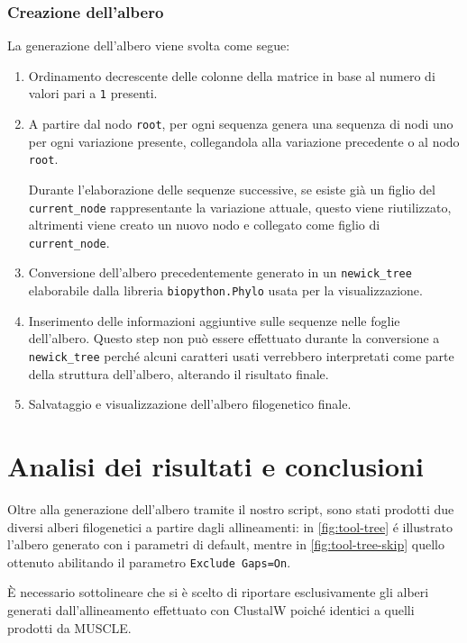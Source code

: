 \documentclass[11pt,italian]{article}
\begin{document}
\subsubsection{Creazione dell'albero}
\noindent
La generazione dell'albero viene svolta come segue:
\begin{enumerate}
  \item Ordinamento decrescente delle colonne della matrice in base al numero di valori pari a \lstinline{1} presenti.
  \item A partire dal nodo \lstinline{root}, per ogni sequenza genera una sequenza di nodi uno per ogni variazione presente, collegandola alla variazione precedente o al nodo \lstinline{root}.

  Durante l'elaborazione delle sequenze successive, se esiste già un figlio del \lstinline{current_node} rappresentante la variazione attuale, questo viene riutilizzato, altrimenti viene creato un nuovo nodo e collegato come figlio di \lstinline{current_node}.

  \item Conversione dell'albero precedentemente generato in un \lstinline{newick_tree} elaborabile dalla libreria \lstinline{biopython.Phylo} usata per la visualizzazione.

  \item Inserimento delle informazioni aggiuntive sulle sequenze nelle foglie dell'albero. Questo step non può essere effettuato durante la conversione a \lstinline{newick_tree} perché alcuni caratteri usati verrebbero interpretati come parte della struttura dell'albero, alterando il risultato finale.

  \item Salvataggio e visualizzazione dell'albero filogenetico finale.
\end{enumerate}

\newpage
\section{Analisi dei risultati e conclusioni}
Oltre alla generazione dell'albero tramite il nostro script, sono stati prodotti due diversi alberi filogenetici a partire dagli allineamenti: in \cref{fig:tool-tree} é illustrato l'albero generato con i parametri di default, mentre in \cref{fig:tool-tree-skip} quello ottenuto abilitando il parametro \lstinline{Exclude Gaps=On}.

È necessario sottolineare che si è scelto di riportare esclusivamente gli alberi generati dall'allineamento effettuato con ClustalW poiché identici a quelli prodotti da MUSCLE.
\end{document}
